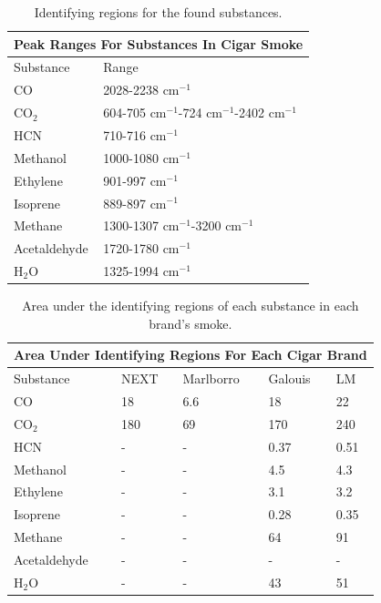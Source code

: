 \documentclass[reprint,amsmath,amssymb,aps, prl]{revtex4-2}
\begin{document}
\begin{table}[h]
    \begin{tabular}{ |p{2.3cm}|p{3cm}|  }
     \hline
     \multicolumn{2}{|c|}{Peak Ranges For Substances In Cigar Smoke} \\ \hline
     Substance & Range\\ \hline
     CO & 2028-2238 $\text{cm}^{-1}$\\ \hline
     $\text{CO}_{2}$ & 604-705 $\text{cm}^{-1}$\newline 717-724 $\text{cm}^{-1}$\newline 2248-2402 $\text{cm}^{-1}$\\ \hline
     HCN & 710-716 $\text{cm}^{-1}$\\ \hline
     Methanol & 1000-1080 $\text{cm}^{-1}$\\ \hline
     Ethylene & 901-997 $\text{cm}^{-1}$\\ \hline
     Isoprene & 889-897 $\text{cm}^{-1}$\\ \hline
     Methane & 1300-1307 $\text{cm}^{-1}$\newline 2820-3200 $\text{cm}^{-1}$\\ \hline
     Acetaldehyde & 1720-1780 $\text{cm}^{-1}$\\ \hline
     $\text{H}_{2}$O & 1325-1994 $\text{cm}^{-1}$\\ \hline
    \end{tabular}
    \caption{Identifying regions for the found substances.}
    \label{tbl:CigarSubstanceRegions}
\end{table}

\begin{table}[h]
    \begin{tabular}{ |p{1.9cm}|p{1.5cm}|p{1.5cm}|p{1.5cm}|p{1.5cm}|  }
     \hline
     \multicolumn{5}{|c|}{Area Under Identifying Regions For Each Cigar Brand} \\ \hline
     Substance & NEXT & Marlborro & Galouis & LM\\ \hline
     CO & 18 & 6.6 & 18 & 22 \\ \hline %
     $\text{CO}_{2}$ & 180 & 69 & 170 & 240 \\ \hline
     HCN  & - & - & 0.37 & 0.51 \\ \hline %
     Methanol & - & - & 4.5 & 4.3 \\ \hline %
     Ethylene & - & - & 3.1 & 3.2 \\ \hline %
     Isoprene & - & - & 0.28 & 0.35 \\ \hline %
     Methane & - & - & 64 & 91 \\ \hline %
     Acetaldehyde & - & - & - & - \\ \hline %
     $\text{H}_{2}$O & - & - & 43 & 51 \\ \hline
    \end{tabular}
    \caption{Area under the identifying regions of each substance in each brand's smoke.}
    \label{tbl:CigarSubstanceAreas}
\end{table}
\end{document}
